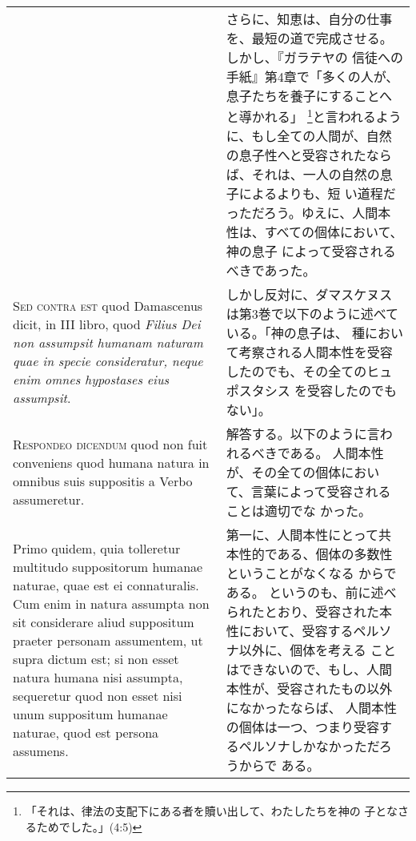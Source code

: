 \documentclass[10pt]{jsarticle} %
\begin{document}
\begin{longtable}{p{21em}p{21em}}
&


さらに、知恵は、自分の仕事を、最短の道で完成させる。しかし、『ガラテヤの
 信徒への手紙』第4章で「多くの人が、息子たちを養子にすることへと導かれる」
 \footnote{「それは、律法の支配下にある者を贖い出して、わたしたちを神の
 子となさるためでした。」(4:5)}と言われるように、もし全ての人間が、自然
 の息子性へと受容されたならば、それは、一人の自然の息子によるよりも、短
 い道程だっただろう。ゆえに、人間本性は、すべての個体において、神の息子
 によって受容されるべきであった。

\\



{\scshape Sed contra est} quod Damascenus dicit, in III libro, quod {\itshape Filius Dei non
assumpsit humanam naturam quae in specie consideratur, neque enim omnes
hypostases eius assumpsit}.


&

しかし反対に、ダマスケヌスは第3巻で以下のように述べている。「神の息子は、
 種において考察される人間本性を受容したのでも、その全てのヒュポスタシス
 を受容したのでもない」。

\\



{\scshape Respondeo dicendum} quod non fuit conveniens quod humana natura in
omnibus suis suppositis a Verbo assumeretur. 


&

解答する。以下のように言われるべきである。
人間本性が、その全ての個体において、言葉によって受容されることは適切でな
 かった。

\\

Primo quidem, quia
tolleretur multitudo suppositorum humanae naturae, quae est ei
connaturalis. 
Cum enim in natura assumpta non sit considerare aliud
suppositum praeter personam assumentem, ut supra dictum est; si non
esset natura humana nisi assumpta, sequeretur quod non esset nisi unum
suppositum humanae naturae, quod est persona assumens. 

&

第一に、人間本性にとって共本性的である、個体の多数性ということがなくなる
 からである。
というのも、前に述べられたとおり、受容された本性において、受容するペルソナ以外に、個体を考える
ことはできないので、もし、人間本性が、受容されたもの以外になかったならば、
 人間本性の個体は一つ、つまり受容するペルソナしかなかっただろうからで
 ある。


\\


\end{longtable}
\end{document}
